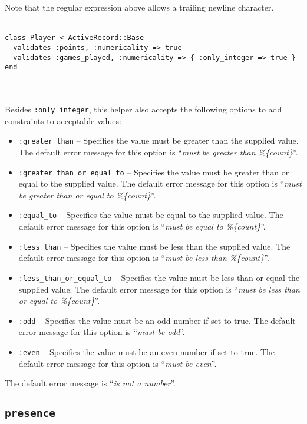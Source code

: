 \documentclass[10pt]{book}
\begin{document}
Note that the regular expression above allows a trailing newline character.
\\ \\
\begin{minipage}{\textwidth}{\scriptsize
\begin{verbatim}
class Player < ActiveRecord::Base
  validates :points, :numericality => true
  validates :games_played, :numericality => { :only_integer => true }
end
\end{verbatim}}
\end{minipage}
\\ \\

Besides \texttt{:only\_integer}, this helper also accepts the following options to add constraints to acceptable values:
\begin{itemize}
	\item \texttt{:greater\_than} – Specifies the value must be greater than the supplied value. The default error message for this option is “\emph{must be greater than \%\{count\}}”.
	\item \texttt{:greater\_than\_or\_equal\_to} – Specifies the value must be greater than or equal to the supplied value. The default error message for this option is “\emph{must be greater than or equal to \%\{count\}}”.
	\item \texttt{:equal\_to} – Specifies the value must be equal to the supplied value. The default error message for this option is “\emph{must be equal to \%\{count\}}”.
	\item \texttt{:less\_than} – Specifies the value must be less than the supplied value. The default error message for this option is “\emph{must be less than \%\{count\}}”.
	\item \texttt{:less\_than\_or\_equal\_to} – Specifies the value must be less than or equal the supplied value. The default error message for this option is “\emph{must be less than or equal to \%\{count\}}”.
	\item \texttt{:odd} – Specifies the value must be an odd number if set to true. The default error message for this option is “\emph{must be odd}”.
	\item \texttt{:even} – Specifies the value must be an even number if set to true. The default error message for this option is “\emph{must be even}”.
\end{itemize}

The default error message is “\emph{is not a number}”.

\subsection{ \texttt{presence}}
\end{document}

